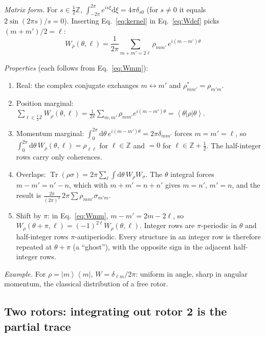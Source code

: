 \documentclass[aps,pra,onecolumn,notitlepage,nofootinbib,11pt]{revtex4-2}
\newcommand{\Tr}{\operatorname{Tr}}
\newcommand{\ket}[1]{\left|#1\right\rangle}
\newcommand{\bra}[1]{\left\langle#1\right|}
\newcommand{\ketbra}[2]{\left|#1\right\rangle\!\left\langle#2\right|}
\newcommand{\dd}{\mathrm{d}}
\begin{document}
\emph{Matrix form.} For $s\in\frac12\mathbb{Z}$, $\int_{-2\pi}^{2\pi}e^{is\xi}\dd\xi=4\pi\delta_{s0}$
(for $s\neq0$ it equals $2\sin(2\pi s)/s=0$). Inserting Eq.~\eqref{eq:kernel} in
Eq.~\eqref{eq:Wdef} picks $(m+m')/2=\ell$:
\begin{equation}
\boxed{\;W_{\rho}(\theta,\ell)=\frac{1}{2\pi}\sum_{m+m'=2\ell}\rho_{mm'}\,e^{i(m-m')\theta}\;}
\label{eq:Wmm}
\end{equation}

\emph{Properties} (each follows from Eq.~\eqref{eq:Wmm}):
\begin{enumerate}
\item Real: the complex conjugate exchanges $m\leftrightarrow m'$ and
$\rho_{mm'}^{*}=\rho_{m'm}$.
\item Position marginal: $\sum_{\ell\in\frac12\mathbb{Z}}W_{\rho}(\theta,\ell)=\frac{1}{2\pi}
\sum_{m,m'}\rho_{mm'}e^{i(m-m')\theta}=\bra\theta\rho\ket\theta$.
\item Momentum marginal: $\int_{0}^{2\pi}\dd\theta\,e^{i(m-m')\theta}=2\pi\delta_{mm'}$ forces
$m=m'=\ell$, so $\int_{0}^{2\pi}\dd\theta\,W_{\rho}(\theta,\ell)=\rho_{\ell\ell}$ for
$\ell\in\mathbb{Z}$ and $=0$ for $\ell\in\mathbb{Z}+\frac12$. The half-integer rows carry
only coherences.
\item Overlaps: $\Tr(\rho\sigma)=2\pi\sum_{\ell}\int\dd\theta\,W_{\rho}W_{\sigma}$. The
$\theta$ integral forces $m-m'=n'-n$, which with $m+m'=n+n'$ gives $m=n'$, $m'=n$, and
the result is $\frac{2\pi}{(2\pi)^{2}}\,2\pi\sum\rho_{mm'}\sigma_{m'm}$.
\item Shift by $\pi$: in Eq.~\eqref{eq:Wmm}, $m-m'=2m-2\ell$, so
$W_{\rho}(\theta+\pi,\ell)=(-1)^{2\ell}W_{\rho}(\theta,\ell)$. Integer rows are
$\pi$-periodic in $\theta$ and half-integer rows $\pi$-antiperiodic. Every structure in
an integer row is therefore repeated at $\theta+\pi$ (a ``ghost''), with the
opposite sign in the adjacent half-integer rows.
\end{enumerate}
\emph{Example.} For $\rho=\ketbra mm$, $W=\delta_{\ell m}/2\pi$: uniform in angle, sharp
in angular momentum, the classical distribution of a free rotor.

\subsection{Two rotors: integrating out rotor 2 is the partial trace}
\end{document}
